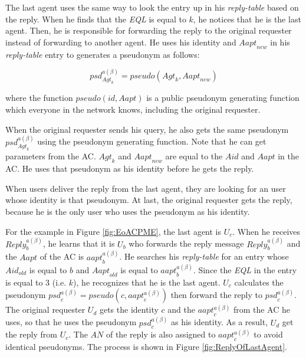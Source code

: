 The last agent uses the same way to look the entry up in his \textit{reply-table} based on the reply. When he finds that the \textit{EQL} is equal to $k$, he notices that he is the last agent. Then, he is responsible for forwarding the reply to the original requester instead of forwarding to another agent. He uses his identity and ${Aapt}_{new}$ in his \textit{reply-table} entry to generates a pseudonym as follows:

\begin{equation} \label{GrindEQ__ACPPsd} 
{psd}_{{Agt}_k}^{a\left( \beta \right)}=pseudo\left({Agt}_k,{Aapt}_{new}\right)
\end{equation}

\noindent where the function $pseudo\left(id,Aapt\right)$ is a public pseudonym generating function which everyone in the network knows, including the original requester.

When the original requester sends his query, he also gets the same pseudonym ${psd}_{{Agt}_k}^{a\left( \beta \right)}$ using the pseudonym generating function. Note that he can get parameters from the AC. ${Agt}_k$ and ${Aapt}_{new}$ are equal to the $Aid$ and $Aapt$ in the AC. He uses that pseudonym as his identity before he gets the reply.

When users deliver the reply from the last agent, they are looking for an user whose identity is that pseudonym. At last, the original requester gets the reply, because he is the only user who uses the pseudonym as his identity.

For the example in Figure \ref{fig:EoACPME}, the last agent is $U_c$. When he receives ${Reply}^{a\left(\beta\right)}_b$, he learns that it is $U_b$ who forwards the reply message ${Reply}^{a\left(\beta\right)}_b$ and the $Aapt$ of the AC is ${aapt}^{a\left(\beta\right)}_b$. He searches his \textit{reply-table} for an entry whose ${Aid}_{old}$ is equal to $b$ and ${Aapt}_{old}$ is equal to ${aapt}^{a\left(\beta\right)}_b$. Since the \textit{EQL} in the entry is equal to 3 (i.e. $k$), he recognizes that he is the last agent. $U_c$ calculates the pseudonym ${psd}^{a\left(\beta \right)}_c=pseudo\left(c,{aapt}^{a\left(\beta\right)}_c\right)$ then forward the reply to ${psd}^{a\left(\beta\right)}_c$. The original requester $U_d$ gets the identity $c$ and the ${aapt}^{a\left(\beta \right)}_c$ from the AC he uses, so that he uses the pseudonym ${psd}^{a\left(\beta \right)}_c$ as his identity. As a result, $U_d$ get the reply from $U_c$. The $AN$ of the reply is also assigned to ${aapt}^{a\left(\beta\right)}_c$ to avoid identical pseudonyms. The process is shown in Figure \ref{fig:ReplyOfLastAgent}. 

